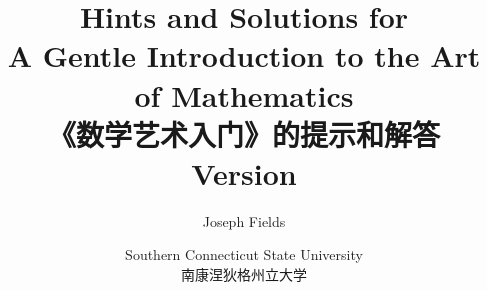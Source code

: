 \documentclass[12pt,twoside]{book}
\begin{document}
\frontmatter

\title{Hints and Solutions for \\
A Gentle Introduction to the Art of Mathematics\\ 《数学艺术入门》的提示和解答 \\{\small Version \versionNum
{} }}
\author{Joseph Fields}
\date{Southern Connecticut State University \\ 南康涅狄格州立大学}

\maketitle

\clearpage



\clearpage

\mainmatter










\end{document}
